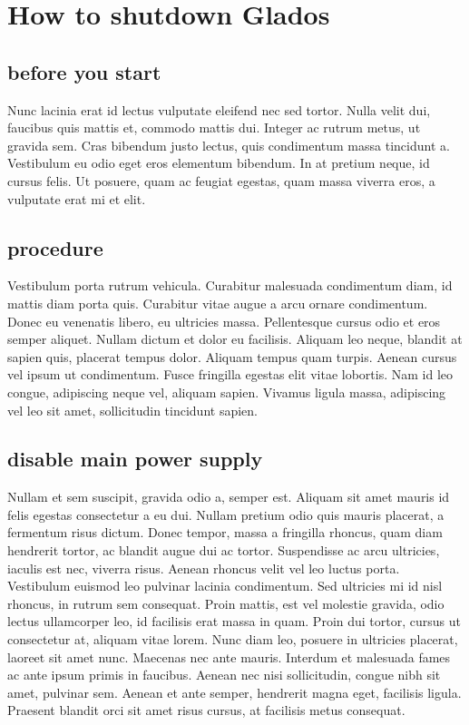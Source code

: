 \documentclass[11pt,a4paper,english]{report}
\begin{document}
\chapter{How to shutdown Glados}
\section{before you start}
\par Nunc lacinia erat id lectus vulputate eleifend nec sed tortor. Nulla velit dui, faucibus quis mattis et, commodo mattis dui. Integer ac rutrum metus, ut gravida sem. Cras bibendum justo lectus, quis condimentum massa tincidunt a. Vestibulum eu odio eget eros elementum bibendum. In at pretium neque, id cursus felis. Ut posuere, quam ac feugiat egestas, quam massa viverra eros, a vulputate erat mi et elit. 

\section{procedure}

\par Vestibulum porta rutrum vehicula. Curabitur malesuada condimentum diam, id mattis diam porta quis. Curabitur vitae augue a arcu ornare condimentum. Donec eu venenatis libero, eu ultricies massa. Pellentesque cursus odio et eros semper aliquet. Nullam dictum et dolor eu facilisis. Aliquam leo neque, blandit at sapien quis, placerat tempus dolor. Aliquam tempus quam turpis. Aenean cursus vel ipsum ut condimentum. Fusce fringilla egestas elit vitae lobortis. Nam id leo congue, adipiscing neque vel, aliquam sapien. Vivamus ligula massa, adipiscing vel leo sit amet, sollicitudin tincidunt sapien.

\section{disable main power supply}
\par Nullam et sem suscipit, gravida odio a, semper est. Aliquam sit amet mauris id felis egestas consectetur a eu dui. Nullam pretium odio quis mauris placerat, a fermentum risus dictum. Donec tempor, massa a fringilla rhoncus, quam diam hendrerit tortor, ac blandit augue dui ac tortor. Suspendisse ac arcu ultricies, iaculis est nec, viverra risus. Aenean rhoncus velit vel leo luctus porta. Vestibulum euismod leo pulvinar lacinia condimentum. Sed ultricies mi id nisl rhoncus, in rutrum sem consequat. Proin mattis, est vel molestie gravida, odio lectus ullamcorper leo, id facilisis erat massa in quam. Proin dui tortor, cursus ut consectetur at, aliquam vitae lorem. Nunc diam leo, posuere in ultricies placerat, laoreet sit amet nunc. Maecenas nec ante mauris. Interdum et malesuada fames ac ante ipsum primis in faucibus. Aenean nec nisi sollicitudin, congue nibh sit amet, pulvinar sem. Aenean et ante semper, hendrerit magna eget, facilisis ligula. Praesent blandit orci sit amet risus cursus, at facilisis metus consequat.
\end{document}
